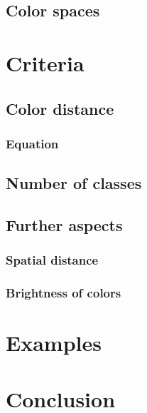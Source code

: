 \subsection{Color spaces}

\section{Criteria}

\subsection{Color distance}\label{subsection:distance}

\subsubsection{Equation}

\subsection{Number of classes}

\subsection{Further aspects}

\subsubsection{Spatial distance}

\subsubsection{Brightness of colors}

\section{Examples}

\section{Conclusion}


\parencite{brychtova2015}
\parencite{brychtova2017}
\parencite{sharma2005}
\parencite{coltekin2015}
\parencite{coltekin2017}

